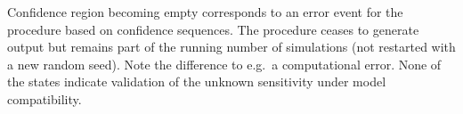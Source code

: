Confidence region becoming empty corresponds to an error event for the procedure based on confidence sequences. The procedure ceases to generate output but remains part of the running number of simulations (not restarted with a new random seed). Note the difference to e.g.\ a computational error. None of the states indicate validation of the unknown sensitivity under model compatibility.
